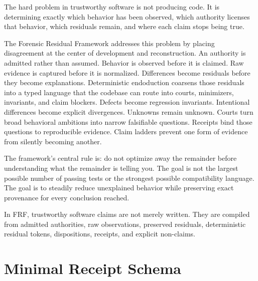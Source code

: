 \documentclass[11pt,a4paper]{article}
\newcommand{\frf}{\textsc{FRF}}
\begin{document}
The hard problem in trustworthy software is not producing code. It is determining exactly which behavior has been observed, which authority licenses that behavior, which residuals remain, and where each claim stops being true.

The Forensic Residual Framework addresses this problem by placing disagreement at the center of development and reconstruction. An authority is admitted rather than assumed. Behavior is observed before it is claimed. Raw evidence is captured before it is normalized. Differences become residuals before they become explanations. Deterministic endoduction coarsens those residuals into a typed language that the codebase can route into courts, minimizers, invariants, and claim blockers. Defects become regression invariants. Intentional differences become explicit divergences. Unknowns remain unknown. Courts turn broad behavioral ambitions into narrow falsifiable questions. Receipts bind those questions to reproducible evidence. Claim ladders prevent one form of evidence from silently becoming another.

The framework's central rule is: do not optimize away the remainder before understanding what the remainder is telling you. The goal is not the largest possible number of passing tests or the strongest possible compatibility language. The goal is to steadily reduce unexplained behavior while preserving exact provenance for every conclusion reached.

In \frf{}, trustworthy software claims are not merely written. They are compiled from admitted authorities, raw observations, preserved residuals, deterministic residual tokens, dispositions, receipts, and explicit non-claims.

\appendix

\clearpage
\section{Minimal Receipt Schema}
\label{app:receipt}
\end{document}
